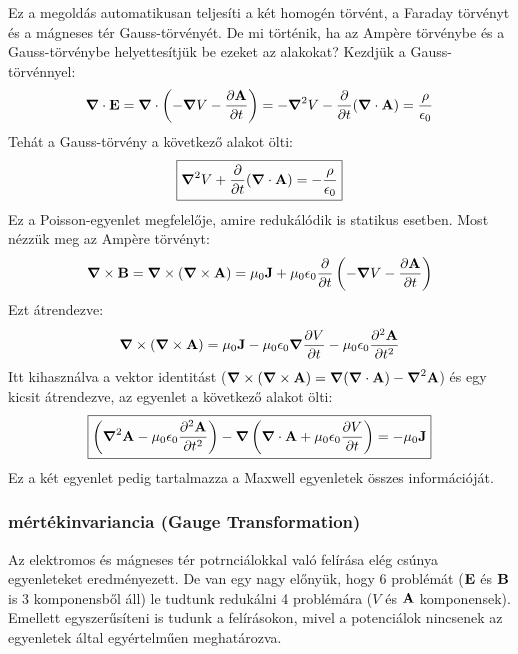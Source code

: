 \documentclass[a4paper,12pt]{article}
\begin{document}
Ez a megoldás automatikusan teljesíti a két homogén törvént, a Faraday törvényt és a mágneses tér Gauss-törvényét. De mi történik, ha az Ampère törvénybe és a Gauss-törvénybe helyettesítjük be ezeket az alakokat?
Kezdjük a Gauss-törvénnyel:
\begin{equation}
    \boldsymbol{\nabla} \cdot \bold{E} = \boldsymbol{\nabla} \cdot \left( - \boldsymbol{\nabla} V - \frac{\partial \bold{A}}{\partial t} \right) = - \boldsymbol{\nabla}^2 V - \frac{\partial }{\partial t} (\boldsymbol{\nabla} \cdot \bold{A}) = \frac{\rho}{\epsilon_0}
\end{equation}
Tehát a Gauss-törvény a következő alakot ölti:
\begin{equation}
    \boxed{\boldsymbol{\nabla}^2 V + \frac{\partial }{\partial t} (\boldsymbol{\nabla} \cdot \bold{A}) = - \frac{\rho}{\epsilon_0}}
\end{equation}
Ez a Poisson-egyenlet megfelelője, amire redukálódik is statikus esetben. Most nézzük meg az Ampère törvényt:
\begin{equation}
    \boldsymbol{\nabla} \times \bold{B} = \boldsymbol{\nabla} \times (\boldsymbol{\nabla} \times \bold{A}) = \mu_0 \bold{J} + \mu_0 \epsilon_0 \frac{\partial }{\partial t} \left( - \boldsymbol{\nabla} V - \frac{\partial \bold{A}}{\partial t} \right)
\end{equation}
Ezt átrendezve:
\begin{equation}
    \boldsymbol{\nabla} \times (\boldsymbol{\nabla} \times \bold{A}) = \mu_0 \bold{J} - \mu_0 \epsilon_0 \boldsymbol{\nabla} \frac{\partial V}{\partial t} - \mu_0 \epsilon_0 \frac{\partial^2 \bold{A}}{\partial t^2}
\end{equation}
Itt kihasználva a vektor identitást ($\boldsymbol{\nabla} \times (\boldsymbol{\nabla} \times \bold{A}) = \boldsymbol{\nabla} (\boldsymbol{\nabla} \cdot \bold{A}) - \boldsymbol{\nabla}^2 \bold{A}$) és egy kicsit átrendezve, az egyenlet a következő alakot ölti:
\begin{equation}
    \boxed{\left(\boldsymbol{\nabla}^2 \bold{A} - \mu_0 \epsilon_0 \frac{\partial^2 \bold{A}}{\partial t^2}\right) - \boldsymbol{\nabla} \left(\boldsymbol{\nabla} \cdot \bold{A} + \mu_0 \epsilon_0 \frac{\partial V}{\partial t}\right) = - \mu_0 \bold{J}}
\end{equation}
Ez a két egyenlet pedig tartalmazza a Maxwell egyenletek összes információját.

\subsubsection{mértékinvariancia (Gauge Transformation)}
Az elektromos és mágneses tér potrnciálokkal való felírása elég csúnya egyenleteket eredményezett. De van egy nagy előnyük, hogy 6 problémát ($\bold{E}$ és $\bold{B}$ is 3 komponensből áll) le tudtunk redukálni 4 problémára ($V$ és $\bold{A}$ komponensek).
Emellett egyszerűsíteni is tudunk a felírásokon, mivel a potenciálok nincsenek az egyenletek által egyértelműen meghatározva. 
\end{document}
